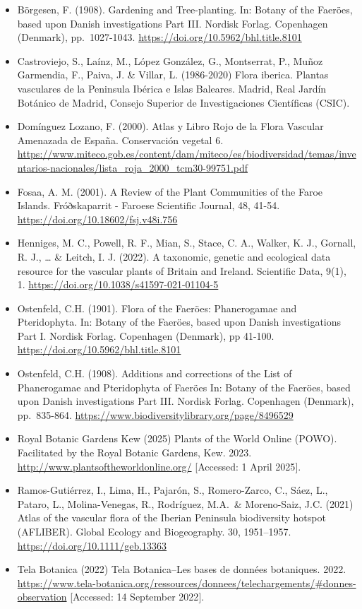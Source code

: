 \documentclass[
]{article}
\providecommand{\tightlist}{%
  \setlength{\itemsep}{0pt}\setlength{\parskip}{0pt}}
\begin{document}
\begin{itemize}
\tightlist
\item
  Börgesen, F. (1908). Gardening and Tree-planting. In: Botany of the
  Faeröes, based upon Danish investigations Part III. Nordisk Forlag.
  Copenhagen (Denmark), pp.~1027-1043.
  \url{https://doi.org/10.5962/bhl.title.8101}
\item
  Castroviejo, S., Laínz, M., López González, G., Montserrat, P., Muñoz
  Garmendia, F., Paiva, J. \& Villar, L. (1986-2020) Flora iberica.
  Plantas vasculares de la Peninsula Ibérica e Islas Baleares. Madrid,
  Real Jardín Botánico de Madrid, Consejo Superior de Investigaciones
  Científicas (CSIC).
\item
  Domínguez Lozano, F. (2000). Atlas y Libro Rojo de la Flora Vascular
  Amenazada de España. Conservación vegetal 6.
  \url{https://www.miteco.gob.es/content/dam/miteco/es/biodiversidad/temas/inventarios-nacionales/lista_roja_2000_tcm30-99751.pdf}
\item
  Fosaa, A. M. (2001). A Review of the Plant Communities of the Faroe
  Islands. Fróðskaparrit - Faroese Scientific Journal, 48, 41-54.
  \url{https://doi.org/10.18602/fsj.v48i.756}
\item
  Henniges, M. C., Powell, R. F., Mian, S., Stace, C. A., Walker, K. J.,
  Gornall, R. J., \ldots{} \& Leitch, I. J. (2022). A taxonomic, genetic
  and ecological data resource for the vascular plants of Britain and
  Ireland. Scientific Data, 9(1), 1.
  \url{https://doi.org/10.1038/s41597-021-01104-5}
\item
  Ostenfeld, C.H. (1901). Flora of the Faeröes: Phanerogamae and
  Pteridophyta. In: Botany of the Faeröes, based upon Danish
  investigations Part I. Nordisk Forlag. Copenhagen (Denmark), pp
  41-100. \url{https://doi.org/10.5962/bhl.title.8101}
\item
  Ostenfeld, C.H. (1908). Additions and corrections of the List of
  Phanerogamae and Pteridophyta of Faeröes In: Botany of the Faeröes,
  based upon Danish investigations Part III. Nordisk Forlag. Copenhagen
  (Denmark), pp.~835-864.
  \url{https://www.biodiversitylibrary.org/page/8496529}
\item
  Royal Botanic Gardens Kew (2025) Plants of the World Online (POWO).
  Facilitated by the Royal Botanic Gardens, Kew. 2023.
  \url{http://www.plantsoftheworldonline.org/} {[}Accessed: 1 April
  2025{]}.
\item
  Ramos-Gutiérrez, I., Lima, H., Pajarón, S., Romero-Zarco, C., Sáez,
  L., Pataro, L., Molina-Venegas, R., Rodríguez, M.A.~\& Moreno-Saiz,
  J.C. (2021) Atlas of the vascular flora of the Iberian Peninsula
  biodiversity hotspot (AFLIBER). Global Ecology and Biogeography. 30,
  1951--1957. \url{https://doi.org/10.1111/geb.13363}
\item
  Tela Botanica (2022) Tela Botanica--Les bases de données botaniques.
  2022.
  \url{https://www.tela-botanica.org/ressources/donnees/telechargements/\#donnes-observation}
  {[}Accessed: 14 September 2022{]}.
\end{itemize}
\end{document}
